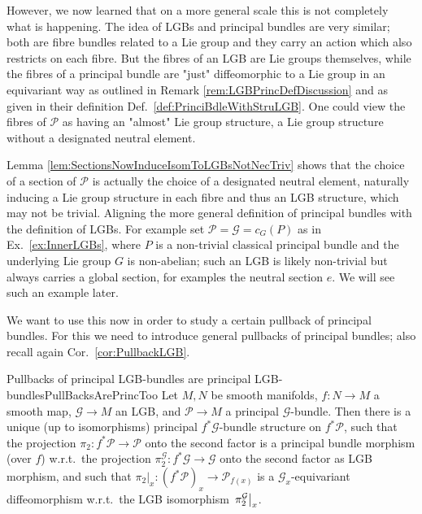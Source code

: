 \documentclass[a4paper,oneside,11pt,bibliography=totoc]{scrartcl}
\theoremstyle{plain}
\theoremstyle{remark}
\theoremstyle{definition}
\begin{document}
However, we now learned that on a more general scale this is not completely what is happening. The idea of LGBs and principal bundles are very similar; both are fibre bundles related to a Lie group and they carry an action which also restricts on each fibre. But the fibres of an LGB are Lie groups themselves, while the fibres of a principal bundle are "just" diffeomorphic to a Lie group in an equivariant way as outlined in Remark \ref{rem:LGBPrincDefDiscussion} and as given in their definition Def.\ \ref{def:PrinciBdleWithStruLGB}. One could view the fibres of $\mathcal{P}$ as having an "almost" Lie group structure, a Lie group structure without a designated neutral element. 

Lemma \ref{lem:SectionsNowInduceIsomToLGBsNotNecTriv} shows that the choice of a section of $\mathcal{P}$ is actually the choice of a designated neutral element, naturally inducing a Lie group structure in each fibre and thus an LGB structure, which may not be trivial. Aligning the more general definition of principal bundles with the definition of LGBs. For example set $\mathcal{P} = \mathcal{G} = c_G(P)$ as in Ex.\ \ref{ex:InnerLGBs}, where $P$ is a non-trivial classical principal bundle and the underlying Lie group $G$ is non-abelian; such an LGB is likely non-trivial but always carries a global section, for examples the neutral section $e$. We will see such an example later.

We want to use this now in order to study a certain pullback of principal bundles. For this we need to introduce general pullbacks of principal bundles; also recall again Cor.\ \ref{cor:PullbackLGB}.

\begin{corollaries}{Pullbacks of principal LGB-bundles are principal LGB-bundles}{PullBacksArePrincToo}
Let $M, N$ be smooth manifolds, $f: N \to M$ a smooth map, $\mathcal{G} \to M$ an LGB, and $\mathcal{P} \to M$ a principal $\mathcal{G}$-bundle. Then there is a unique (up to isomorphisms) principal $f^*\mathcal{G}$-bundle structure on $f^*\mathcal{P}$, such that the projection $\pi_2: f^*\mathcal{P} \to \mathcal{P}$ onto the second factor is a principal bundle morphism (over $f$) w.r.t.\ the projection $\pi_2^{\mathcal{G}}: f^*\mathcal{G} \to \mathcal{G}$ onto the second factor as LGB morphism, and such that $\pi_2|_x: (f^*\mathcal{P})_x \to \mathcal{P}_{f(x)}$ is a $\mathcal{G}_x$-equivariant diffeomorphism w.r.t.\ the LGB isomorphism $\mleft.\pi_2^{\mathcal{G}}\mright|_x$.
%
\end{corollaries}
\end{document}

